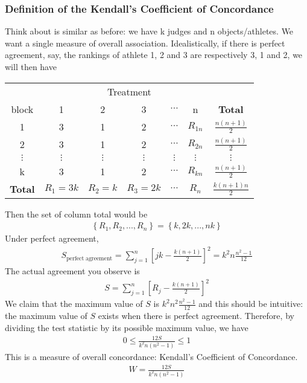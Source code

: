 \documentclass[twoside]{article}
\begin{document}
	\subsubsection{Definition of the Kendall's Coefficient of Concordance}
	Think about is similar as before: we have k judges and n objects/athletes. We want a single measure of overall association. Idealistically, if there is perfect agreement, say, the rankings of athlete 1, 2 and 3 are respectively 3, 1 and 2, we will then have
	\begin{center}
		\begin{tabular}{c|c|c|c|c|c|c}
			\multicolumn{7}{c}{Treatment}\\
			block & 1 & 2 & 3 & $\cdots$ & n & \textbf{Total}\\
			\hline
			1 & 3 & 1 & 2 & $\cdots$ & $R_{1n}$ & $\frac{n(n+1)}{2}$\\
			\hline
			2 & 3 & 1 & 2 & $\cdots$ & $R_{2n}$ & $\frac{n(n+1)}{2}$\\
			\hline
			$\vdots$ & $\vdots$ & $\vdots$ & $\vdots$ & $\vdots$ & $\vdots$ & $\vdots$\\
			\hline
			k & 3 & 1 & 2 & $\cdots$ & $R_{kn}$ & $\frac{n(n+1)}{2}$\\
			\hline
			\textbf{Total} & $R_1 = 3k$ & $R_2 = k$ & $R_3 = 2k$ & $\cdots$ & $R_n$ & $\frac{k(n+1)n}{2}$
		\end{tabular}
	\end{center}
	Then the set of column total would be
	\begin{align*}
		\left\{ R_1, R_2, ..., R_n \right\} = \left\{ k, 2k, ..., nk \right\} 
	\end{align*}
	Under perfect agreement, 
	\begin{align*}
		S_{\mathrm{perfect \; agreement}} = \sum_{j=1}^{n} \left[ jk - \frac{k (n+1)}{2} \right]^2 = k^2 n \frac{n^2 - 1}{12}
	\end{align*}
	The actual agreement you observe is
	\begin{align*}
		S = \sum_{j=1}^{n} \left[ R_j - \frac{k(n+1)}{2} \right]^2
	\end{align*}
	We claim that the maximum value of $S$ is $k^2 n^2 \frac{n^2 - 1}{12}$ and this should be intuitive: the maximum value of $S$ exists when there is perfect agreement. Therefore, by dividing the test statistic by its possible maximum value, we have
	\begin{align*}
		0 \leqslant \frac{12 S}{k^2 n (n^2 - 1)} \leqslant 1
	\end{align*}
	This is a measure of overall concordance: Kendall's Coefficient of Concordance. 
	\begin{align*}
		W = \frac{12 S}{k^2 n (n^2 - 1)}
	\end{align*}
	
\end{document}

